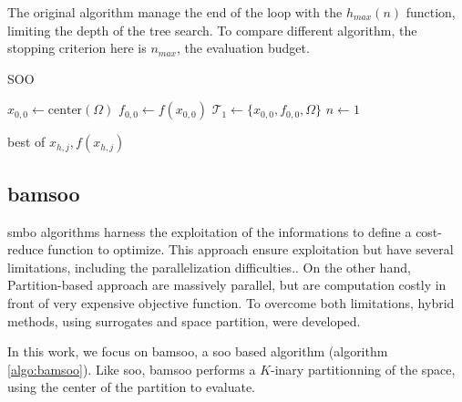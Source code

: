 The original algorithm manage the end of the loop with the $h_{max}(n)$ function, limiting the depth of the tree search. To compare different algorithm, the stopping criterion here is $n_{max}$, the evaluation budget. 

\begin{algorithm}[h]
    \caption{SOO \hfill}
    \label{algo:soo}
    $x_{0,0} \gets \text{center}(\Omega)$ \;
    $f_{0,0} \gets f(x_{0,0})$ \;
    $\mathcal{T}_1 \gets \{x_{0,0}, f_{0,0}, \Omega\}$ \;
    $n \gets 1$ \;

    \Return best of $x_{h,j}, f(x_{h,j})$ \;
    \end{algorithm}
\subsection{\acrfull{bamsoo}}
\label{sec:bamsoo}

\acrfull{smbo} algorithms harness the exploitation of the informations to define a cost-reduce function to optimize. This approach ensure exploitation but have several limitations, including the parallelization difficulties.. On the other hand, Partition-based approach are massively parallel, but are computation costly in front of very expensive objective function. To overcome both limitations, hybrid methods, using surrogates and space partition, were developed.

In this work, we focus on \acrshort{bamsoo}\cite{wang_bayesian_2014}, a \acrshort{soo} based algorithm (algorithm \ref{algo:bamsoo}). Like \acrshort{soo}, \acrshort{bamsoo} performs a $K$-inary partitionning of the space, using the center of the partition to evaluate. 

